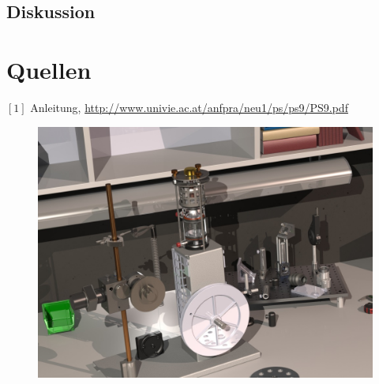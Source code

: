\documentclass[12pt,a4paper]{article}
\begin{document}
\begin{multicols}{2}
\subsection{Diskussion}





\section{Quellen}
$[1]$ Anleitung, \url{http://www.univie.ac.at/anfpra/neu1/ps/ps9/PS9.pdf}\\

\end{multicols}

\begin{figure}[H]
	\centering
	\includegraphics[scale=2]{./data/3D-Model/PS9-model_desk01.JPG}
	\label{fig:stirlingMotor_3D-desktop}
\end{figure}
\end{document}
